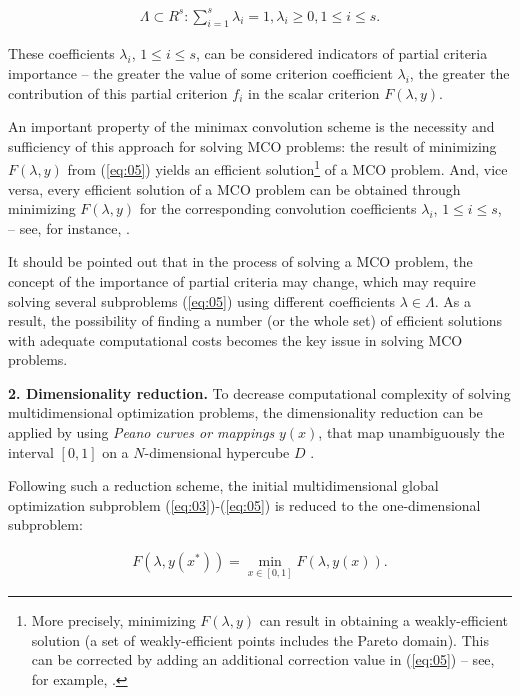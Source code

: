 \documentclass[smallcondensed]{svjour3}     %
\begin{document}
\begin{eqnarray*}
   \Lambda \subset R^s:\sum_{i=1}^s{\lambda_i} = 1, \lambda_i \geq 0, 1 \leq i \leq s.
\end{eqnarray*}

These coefficients $\lambda_i$, $1 \leq i \leq s$, can be considered indicators of partial criteria importance -- the greater the value of some criterion coefficient $\lambda_i$, the greater the contribution of this partial criterion $f_i$ in the scalar criterion $F(\lambda,y)$. \par

An important property of the minimax convolution scheme is the necessity and sufficiency of this approach for solving MCO problems: the result of minimizing $F(\lambda,y)$ from (\ref{eq:05}) yields an efficient solution\footnote{More precisely, minimizing $F(\lambda,y)$ can result in obtaining a weakly-efficient solution (a set of weakly-efficient points includes the Pareto domain). This can be corrected by adding an additional correction value in (\ref{eq:05}) -- see, for example, \cite{c19,c29}.}  of a MCO problem. And, vice versa, every efficient solution of a MCO problem can be obtained through minimizing $F(\lambda,y)$ for the corresponding convolution coefficients $\lambda_i$, $1 \leq i \leq s$, -- see, for instance, \cite{c19,c29}.\par

It should be pointed out that in the process of solving a MCO problem, the concept of the importance of partial criteria may change, which may require solving several subproblems (\ref{eq:05}) using different coefficients $\lambda \in \Lambda$. As a result, the possibility of finding a number (or the whole set) of efficient solutions with adequate computational costs becomes the key issue in solving MCO problems.\par

{\bf 2. Dimensionality reduction.} To decrease computational complexity of solving multidimensional optimization problems, the dimensionality reduction can be applied by using {\it Peano curves or mappings} $y(x)$, that map unambiguously the interval $[0,1]$ on a $N$-dimensional hypercube $D$ \cite{c35,c37,c38}. \par

Following such a reduction scheme, the initial multidimensional global optimization subproblem (\ref{eq:03})-(\ref{eq:05}) is reduced to the one-dimensional subproblem:

\begin{eqnarray} \label{eq:06}
F(\lambda, y(x^*)) = \min_{x \in [0,1]}{F(\lambda, y(x))}.
\end{eqnarray}
\end{document}
